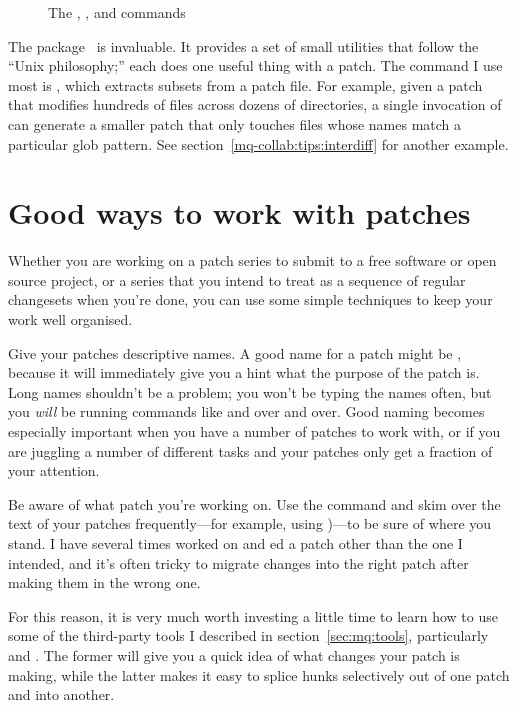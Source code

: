 \begin{figure}[ht]
  \caption{The , , and  commands}
  \label{ex:mq:tools}
\end{figure}

The  package~\cite{web:patchutils} is invaluable.
It provides a set of small utilities that follow the ``Unix
philosophy;'' each does one useful thing with a patch.  The
 command I use most is , which
extracts subsets from a patch file.  For example, given a patch that
modifies hundreds of files across dozens of directories, a single
invocation of  can generate a smaller patch that
only touches files whose names match a particular glob pattern.  See
section~\ref{mq-collab:tips:interdiff} for another example.

\section{Good ways to work with patches}

Whether you are working on a patch series to submit to a free software
or open source project, or a series that you intend to treat as a
sequence of regular changesets when you're done, you can use some
simple techniques to keep your work well organised.

Give your patches descriptive names.  A good name for a patch might be
, because it will immediately give
you a hint what the purpose of the patch is.  Long names shouldn't be
a problem; you won't be typing the names often, but you \emph{will} be
running commands like  and  over and over.
Good naming becomes especially important when you have a number of
patches to work with, or if you are juggling a number of different
tasks and your patches only get a fraction of your attention.

Be aware of what patch you're working on.  Use the 
command and skim over the text of your patches frequently---for
example, using )---to be sure of where
you stand.  I have several times worked on and ed a
patch other than the one I intended, and it's often tricky to migrate
changes into the right patch after making them in the wrong one.

For this reason, it is very much worth investing a little time to
learn how to use some of the third-party tools I described in
section~\ref{sec:mq:tools}, particularly  and
.  The former will give you a quick idea of what
changes your patch is making, while the latter makes it easy to splice
hunks selectively out of one patch and into another.

